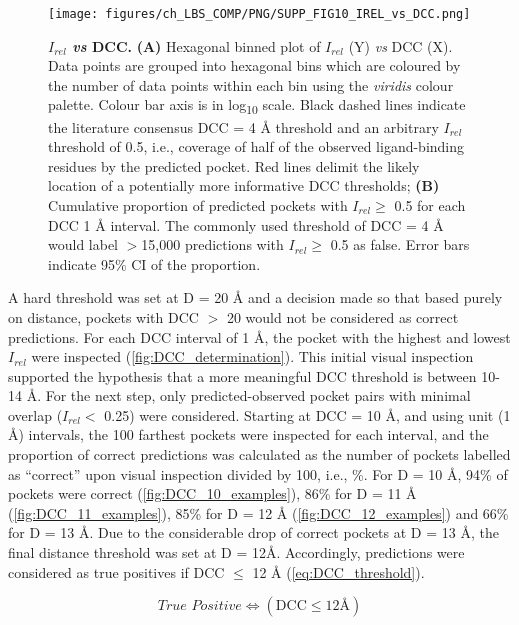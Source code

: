 \begin{figure}[htb!]
    \centering
    \texttt{[image: figures/ch\_LBS\_COMP/PNG/SUPP\_FIG10\_IREL\_vs\_DCC.png]}
    \caption[$I_{rel}$ \textit{vs} DCC]{\textbf{$I_{rel}$ \textit{vs} DCC.} \textbf{(A)} Hexagonal binned plot of $I_{rel}$ (Y) \textit{vs} DCC (X). Data points are grouped into hexagonal bins which are coloured by the number of data points within each bin using the \textit{viridis} colour palette. Colour bar axis is in log\textsubscript{10} scale. Black dashed lines indicate the literature consensus DCC = 4 \AA{} threshold and an arbitrary $I_{rel}$ threshold of 0.5, i.e., coverage of half of the observed ligand-binding residues by the predicted pocket.  Red lines delimit the likely location of a potentially more informative DCC thresholds; \textbf{(B)} Cumulative proportion of predicted pockets with $I_{rel} \geq$ 0.5 for each DCC 1 \AA{} interval. The commonly used threshold of DCC = 4 \AA{} would label $>$15,000 predictions with $I_{rel} \geq$ 0.5 as false. Error bars indicate 95\% CI of the proportion.}
    \label{fig:irel_vs_dcc}
\end{figure}

A hard threshold was set at D = 20 \AA{} and a decision made so that based purely on distance, pockets with DCC $>$ 20 would not be considered as correct predictions. For each DCC interval of 1 \AA{}, the pocket with the highest and lowest $I_{rel}$ were inspected (\autoref{fig:DCC_determination}). This initial visual inspection supported the hypothesis that a more meaningful DCC threshold is between 10-14 \AA{}. For the next step, only predicted-observed pocket pairs with minimal overlap ($I_{rel} <$ 0.25) were considered. Starting at DCC = 10 \AA{}, and using unit (1 \AA{}) intervals, the 100 farthest pockets were inspected for each interval, and the proportion of correct predictions was calculated as the number of pockets labelled as ``correct'' upon visual inspection divided by 100, i.e., \%. For D = 10 \AA{}, 94\% of pockets were correct (\autoref{fig:DCC_10_examples}), 86\% for D = 11 \AA{} (\autoref{fig:DCC_11_examples}), 85\% for D = 12 \AA{} (\autoref{fig:DCC_12_examples}) and 66\% for D = 13 \AA{}. Due to the considerable drop of correct pockets at D = 13 \AA{}, the final distance threshold was set at D = 12\AA{}. Accordingly, predictions were considered as true positives if DCC $\leq$ 12 \AA{} (\autoref{eq:DCC_threshold}).

\begin{equation}
\textit{True Positive} \iff (\text{DCC} \leq 12\text{\AA{}})
\label{eq:DCC_threshold}
\end{equation}

